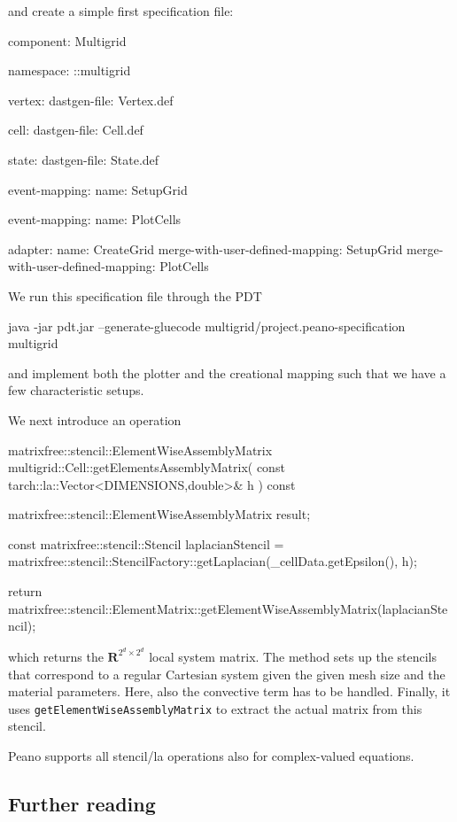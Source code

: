\noindent
and create a simple first specification file:
\begin{code}
component: Multigrid

namespace: ::multigrid

vertex:
  dastgen-file: Vertex.def
  
cell:
  dastgen-file: Cell.def

state:
  dastgen-file: State.def

event-mapping:
  name: SetupGrid

event-mapping:
  name: PlotCells

adapter:
  name: CreateGrid
  merge-with-user-defined-mapping: SetupGrid
  merge-with-user-defined-mapping: PlotCells
\end{code}

\noindent
We run this specification file through the PDT

\begin{code}
java -jar pdt.jar --generate-gluecode multigrid/project.peano-specification multigrid
\end{code}


\noindent
and implement both the plotter and the creational mapping such that we have a
few characteristic setups. 

We next introduce an operation 
\begin{code}
matrixfree::stencil::ElementWiseAssemblyMatrix multigrid::Cell::getElementsAssemblyMatrix(
  const tarch::la::Vector<DIMENSIONS,double>&  h
) const {
  matrixfree::stencil::ElementWiseAssemblyMatrix result;

  const matrixfree::stencil::Stencil laplacianStencil = 
    matrixfree::stencil::StencilFactory::getLaplacian(_cellData.getEpsilon(), h);

  return matrixfree::stencil::ElementMatrix::getElementWiseAssemblyMatrix(laplacianStencil);
}
\end{code}
which returns the $\mathbf{R}^{2^d \times 2^d}$ local system matrix. 
The method sets up the stencils that correspond to a regular Cartesian system
given the given mesh size  and the material parameters.
Here, also the convective term has to be handled.
Finally, it uses \texttt{getElementWiseAssemblyMatrix} to extract the actual
matrix from this stencil.

\begin{remark}
  Peano supports all stencil/la operations also for complex-valued equations.
\end{remark}


\subsection*{Further reading}

